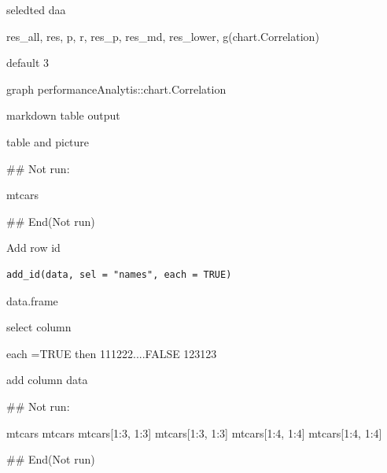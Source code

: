 \documentclass[a4paper]{book}
\begin{document}
%
\begin{Arguments}
\begin{ldescription}
\item[\code{selectdata}] seledted daa

\item[\code{type}] res\_all, res, p, r, res\_p, res\_md, res\_lower, g(chart.Correlation)

\item[\code{digits}] default 3

\item[\code{plot}] graph performanceAnalytis::chart.Correlation

\item[\code{md}] markdown table output
\end{ldescription}
\end{Arguments}
%
\begin{Value}
table and picture
\end{Value}
%
\begin{Examples}
\begin{ExampleCode}

## Not run: 

mtcars%

## End(Not run)
\end{ExampleCode}
\end{Examples}
%
\begin{Description}
Add row id
\end{Description}
%
\begin{Usage}
\begin{verbatim}
add_id(data, sel = "names", each = TRUE)
\end{verbatim}
\end{Usage}
%
\begin{Arguments}
\begin{ldescription}
\item[\code{data}] data.frame

\item[\code{sel}] select column

\item[\code{each}] each =TRUE then 111222....FALSE 123123
\end{ldescription}
\end{Arguments}
%
\begin{Value}
add column data
\end{Value}
%
\begin{Examples}
\begin{ExampleCode}

## Not run: 

mtcars %
mtcars %
mtcars[1:3, 1:3] %
mtcars[1:3, 1:3] %
mtcars[1:4, 1:4] %
mtcars[1:4, 1:4] %




## End(Not run)
\end{ExampleCode}
\end{Examples}
\end{document}
